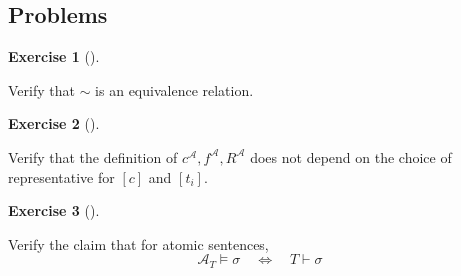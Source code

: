 \documentclass[
]{article}
\theoremstyle{definition}
\newtheorem{exercise}{Exercise}[section]
\theoremstyle{remark}
\begin{document}
\subsection{Problems}\label{problems}

\begin{exercise}[]\protect\hypertarget{exr-}{}\label{exr-}

\hfill\break
Verify that \(\sim\) is an equivalence relation.

\end{exercise}

\begin{exercise}[]\protect\hypertarget{exr-}{}\label{exr-}

\hfill\break
Verify that the definition of
\(c^\mathcal{A}, f^\mathcal{A}, R^\mathcal{A}\) does not depend on the
choice of representative for \([c]\) and \([t_i]\).

\end{exercise}

\begin{exercise}[]\protect\hypertarget{exr-}{}\label{exr-}

\hfill\break
Verify the claim that for atomic sentences,
\[\mathcal{A}_T \models \sigma \quad \iff \quad T \vdash \sigma\]

\end{exercise}
\end{document}
